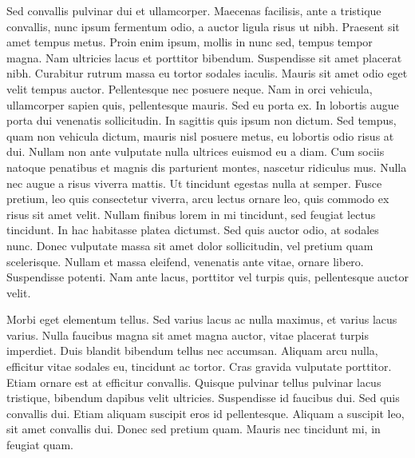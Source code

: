 Sed convallis pulvinar dui et ullamcorper. Maecenas facilisis, ante a tristique convallis, nunc ipsum fermentum odio, a auctor ligula risus ut nibh. Praesent sit amet tempus metus. Proin enim ipsum, mollis in nunc sed, tempus tempor magna. Nam ultricies lacus et porttitor bibendum. Suspendisse sit amet placerat nibh. Curabitur rutrum massa eu tortor sodales iaculis. Mauris sit amet odio eget velit tempus auctor. Pellentesque nec posuere neque. Nam in orci vehicula, ullamcorper sapien quis, pellentesque mauris. Sed eu porta ex. 
In lobortis augue porta dui venenatis sollicitudin. In sagittis quis ipsum non dictum. Sed tempus, quam non vehicula dictum, mauris nisl posuere metus, eu lobortis odio risus at dui. Nullam non ante vulputate nulla ultrices euismod eu a diam. Cum sociis natoque penatibus et magnis dis parturient montes, nascetur ridiculus mus. Nulla nec augue a risus viverra mattis. Ut tincidunt egestas nulla at semper. Fusce pretium, leo quis consectetur viverra, arcu lectus ornare leo, quis commodo ex risus sit amet velit. Nullam finibus lorem in mi tincidunt, sed feugiat lectus tincidunt. In hac habitasse platea dictumst. Sed quis auctor odio, at sodales nunc. Donec vulputate massa sit amet dolor sollicitudin, vel pretium quam scelerisque. Nullam et massa eleifend, venenatis ante vitae, ornare libero. Suspendisse potenti. Nam ante lacus, porttitor vel turpis quis, pellentesque auctor velit.

Morbi eget elementum tellus. Sed varius lacus ac nulla maximus, et varius lacus varius. Nulla faucibus magna sit amet magna auctor, vitae placerat turpis imperdiet. Duis blandit bibendum tellus nec accumsan. Aliquam arcu nulla, efficitur vitae sodales eu, tincidunt ac tortor. Cras gravida vulputate porttitor. Etiam ornare est at efficitur convallis. Quisque pulvinar tellus pulvinar lacus tristique, bibendum dapibus velit ultricies. Suspendisse id faucibus dui. Sed quis convallis dui. Etiam aliquam suscipit eros id pellentesque. Aliquam a suscipit leo, sit amet convallis dui. Donec sed pretium quam. Mauris nec tincidunt mi, in feugiat quam.

